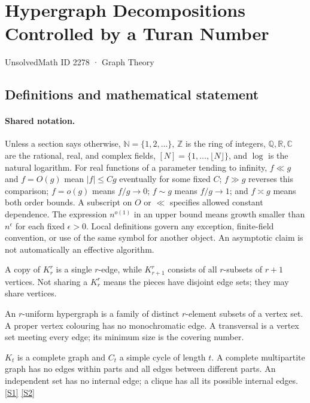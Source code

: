 \documentclass[11pt,a4paper]{article}
\newcommand{\N}{\mathbb{N}}
\newcommand{\Z}{\mathbb{Z}}
\newcommand{\Q}{\mathbb{Q}}
\newcommand{\R}{\mathbb{R}}
\newcommand{\C}{\mathbb{C}}
\newcommand{\sref}[2]{\hyperlink{source:#1:#2}{[S#2]}}
\begin{document}

\setcounter{section}{2277}

\section{Hypergraph Decompositions Controlled by a Turan Number}\label{2278}

{\small\sffamily UnsolvedMath ID 2278 · Graph Theory}

\subsection{Definitions and mathematical statement}

\paragraph{Shared notation.}Unless a section says otherwise, $\N=\{1,2,\ldots\}$,
$\Z$ is the ring of integers, $\Q,\R,\C$ are the rational, real, and complex
fields, $[N]=\{1,\ldots,\lfloor N\rfloor\}$, and $\log$ is the natural
logarithm. For real functions of a parameter tending to infinity,
$f\ll g$ and $f=O(g)$ mean $|f|\leq Cg$ eventually for some fixed $C$;
$f\gg g$ reverses this comparison; $f=o(g)$ means $f/g\to0$;
$f\sim g$ means $f/g\to1$; and $f\asymp g$ means both order bounds.
A subscript on $O$ or $\ll$ specifies allowed constant dependence.
The expression $n^{o(1)}$ in an upper bound means growth smaller than
$n^\epsilon$ for each fixed $\epsilon>0$. Local definitions govern any
exception, finite-field convention, or use of the same symbol for another
object. An asymptotic claim is not automatically an effective algorithm.



A copy of $K_r^r$ is a single $r$-edge, while $K_{r+1}^r$ consists of all $r$-subsets of $r+1$ vertices. Not sharing a $K_r^r$ means the pieces have disjoint edge sets; they may share vertices.

An $r$-uniform hypergraph is a family of distinct $r$-element subsets of a vertex set. A proper vertex colouring has no monochromatic edge. A transversal is a vertex set meeting every edge; its minimum size is the covering number.

$K_t$ is a complete graph and $C_t$ a simple cycle of length $t$. A complete multipartite graph has no edges within parts and all edges between different parts. An independent set has no internal edge; a clique has all its possible internal edges. \sref{2278}{1} \sref{2278}{2}
\end{document}
